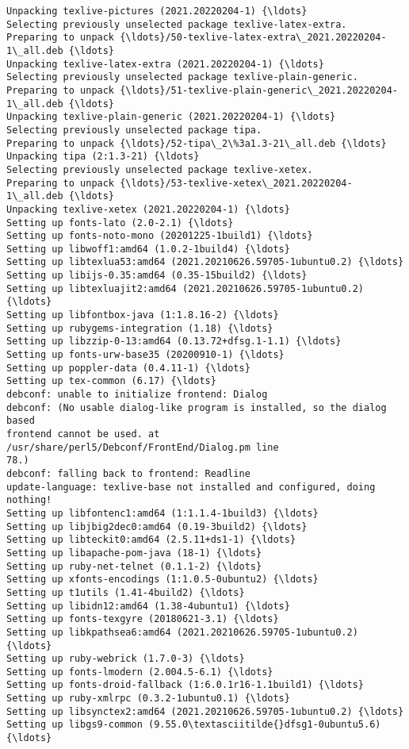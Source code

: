\documentclass[11pt]{article}
\begin{document}
\begin{Verbatim}[commandchars=\\\{\}]
Unpacking texlive-pictures (2021.20220204-1) {\ldots}
Selecting previously unselected package texlive-latex-extra.
Preparing to unpack {\ldots}/50-texlive-latex-extra\_2021.20220204-1\_all.deb {\ldots}
Unpacking texlive-latex-extra (2021.20220204-1) {\ldots}
Selecting previously unselected package texlive-plain-generic.
Preparing to unpack {\ldots}/51-texlive-plain-generic\_2021.20220204-1\_all.deb {\ldots}
Unpacking texlive-plain-generic (2021.20220204-1) {\ldots}
Selecting previously unselected package tipa.
Preparing to unpack {\ldots}/52-tipa\_2\%3a1.3-21\_all.deb {\ldots}
Unpacking tipa (2:1.3-21) {\ldots}
Selecting previously unselected package texlive-xetex.
Preparing to unpack {\ldots}/53-texlive-xetex\_2021.20220204-1\_all.deb {\ldots}
Unpacking texlive-xetex (2021.20220204-1) {\ldots}
Setting up fonts-lato (2.0-2.1) {\ldots}
Setting up fonts-noto-mono (20201225-1build1) {\ldots}
Setting up libwoff1:amd64 (1.0.2-1build4) {\ldots}
Setting up libtexlua53:amd64 (2021.20210626.59705-1ubuntu0.2) {\ldots}
Setting up libijs-0.35:amd64 (0.35-15build2) {\ldots}
Setting up libtexluajit2:amd64 (2021.20210626.59705-1ubuntu0.2) {\ldots}
Setting up libfontbox-java (1:1.8.16-2) {\ldots}
Setting up rubygems-integration (1.18) {\ldots}
Setting up libzzip-0-13:amd64 (0.13.72+dfsg.1-1.1) {\ldots}
Setting up fonts-urw-base35 (20200910-1) {\ldots}
Setting up poppler-data (0.4.11-1) {\ldots}
Setting up tex-common (6.17) {\ldots}
debconf: unable to initialize frontend: Dialog
debconf: (No usable dialog-like program is installed, so the dialog based
frontend cannot be used. at /usr/share/perl5/Debconf/FrontEnd/Dialog.pm line
78.)
debconf: falling back to frontend: Readline
update-language: texlive-base not installed and configured, doing nothing!
Setting up libfontenc1:amd64 (1:1.1.4-1build3) {\ldots}
Setting up libjbig2dec0:amd64 (0.19-3build2) {\ldots}
Setting up libteckit0:amd64 (2.5.11+ds1-1) {\ldots}
Setting up libapache-pom-java (18-1) {\ldots}
Setting up ruby-net-telnet (0.1.1-2) {\ldots}
Setting up xfonts-encodings (1:1.0.5-0ubuntu2) {\ldots}
Setting up t1utils (1.41-4build2) {\ldots}
Setting up libidn12:amd64 (1.38-4ubuntu1) {\ldots}
Setting up fonts-texgyre (20180621-3.1) {\ldots}
Setting up libkpathsea6:amd64 (2021.20210626.59705-1ubuntu0.2) {\ldots}
Setting up ruby-webrick (1.7.0-3) {\ldots}
Setting up fonts-lmodern (2.004.5-6.1) {\ldots}
Setting up fonts-droid-fallback (1:6.0.1r16-1.1build1) {\ldots}
Setting up ruby-xmlrpc (0.3.2-1ubuntu0.1) {\ldots}
Setting up libsynctex2:amd64 (2021.20210626.59705-1ubuntu0.2) {\ldots}
Setting up libgs9-common (9.55.0\textasciitilde{}dfsg1-0ubuntu5.6) {\ldots}

\end{Verbatim}
\end{document}
